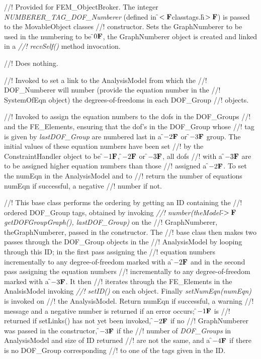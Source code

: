 //! Provided for FEM\_ObjectBroker. The integer {\em NUMBERER\_TAG\_DOF\_Numberer}
(defined in \f$<{\bf F}$classtags.h\f$>{\bf F}$) is passed to the MovableObject classes
//! constructor. Sets the GraphNumberer to be used in the numbering to be
\f$0{\bf F}$, the GraphNumberer object is created and linked in a {\em
//! recvSelf()} method invocation.


//! Does nothing.

//! Invoked to set a link to the AnalysisModel from which the
//! DOF\_Numberer will number (provide the equation number in the
//! SystemOfEqn object) the degrees-of-freedoms in each DOF\_Group
//! objects.  

//! Invoked to assign the equation numbers to the dofs in the DOF\_Groups
//! and the FE\_Elements, ensuring that the dof's in the DOF\_Group whose
//! tag is given by {\em lastDOF\_Group} are numbered last in a \f$-2{\bf F}$ or
\f$-3{\bf F}$ group. The initial values of these equation numbers have been set
//! by the ConstraintHandler object to be \f$-1{\bf F}$, \f$-2{\bf F}$ or \f$-3{\bf F}$, all dofs
//! with a \f$-3{\bf F}$ are to be assigned higher equation numbers than those
//! assigned a \f$-2{\bf F}$. To set the \p numEqn in the AnalysisModel and to
//! return the number of equations \p numEqn if successful, a negative
//! number if not.  

//! This base class performs the ordering by getting an ID containing the
//! ordered DOF\_Group tags, obtained by invoking {\em
//! number(theModel-\f$>{\bf F}$getDOFGroupGraph(), lastDOF\_Group)} on the
//! GraphNumberer, \p theGraphNumberer, passed in the constructor. The
//! base class then makes two passes through the DOF\_Group objects in the
//! AnalysisModel by looping through this ID; in the first pass assigning the
//! equation numbers incrementally to any degree-of-freedom marked with a
\f$-2{\bf F}$ and in the second pass assigning the equation numbers
//! incrementally to any degree-of-freedom marked with a \f$-3{\bf F}$. It then
//! iterates through the FE\_Elements in the AnalsisModel invoking {\em
//! setID()} on each object. Finally {\em setNumEqn(numEqn)} is invoked on
//! the AnalysisModel. Return \p numEqn if successful, a warning
//! message and a negative number is returned if an error occurs; \f$-1{\bf F}$ is
//! returned if setLinks() has not yet been invoked, \f$-2{\bf F}$ if no
//! GraphNumberer was passed in the constructor, \f$-3{\bf F}$ if the
//! number of {\em DOF\_Groups} in AnalysisModel and size of ID returned
//! are not the same, and a \f$-4{\bf F}$ if there is no DOF\_Group corresponding
//! to one of the tags given in the ID.



